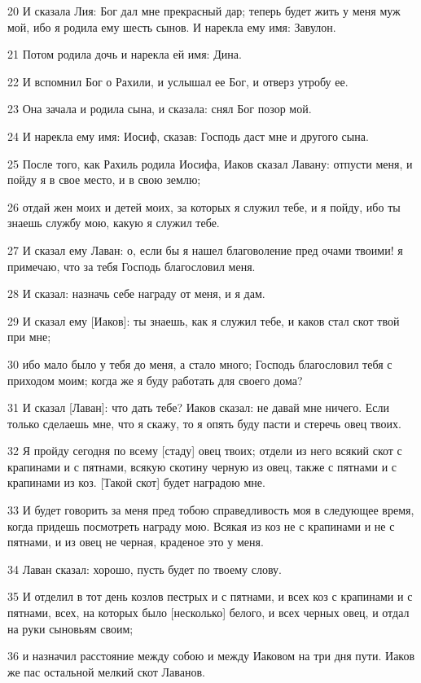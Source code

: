 \par 20 И сказала Лия: Бог дал мне прекрасный дар; теперь будет жить у меня муж мой, ибо я родила ему шесть сынов. И нарекла ему имя: Завулон.
\par 21 Потом родила дочь и нарекла ей имя: Дина.
\par 22 И вспомнил Бог о Рахили, и услышал ее Бог, и отверз утробу ее.
\par 23 Она зачала и родила сына, и сказала: снял Бог позор мой.
\par 24 И нарекла ему имя: Иосиф, сказав: Господь даст мне и другого сына.
\par 25 После того, как Рахиль родила Иосифа, Иаков сказал Лавану: отпусти меня, и пойду я в свое место, и в свою землю;
\par 26 отдай жен моих и детей моих, за которых я служил тебе, и я пойду, ибо ты знаешь службу мою, какую я служил тебе.
\par 27 И сказал ему Лаван: о, если бы я нашел благоволение пред очами твоими! я примечаю, что за тебя Господь благословил меня.
\par 28 И сказал: назначь себе награду от меня, и я дам.
\par 29 И сказал ему [Иаков]: ты знаешь, как я служил тебе, и каков стал скот твой при мне;
\par 30 ибо мало было у тебя до меня, а стало много; Господь благословил тебя с приходом моим; когда же я буду работать для своего дома?
\par 31 И сказал [Лаван]: что дать тебе? Иаков сказал: не давай мне ничего. Если только сделаешь мне, что я скажу, то я опять буду пасти и стеречь овец твоих.
\par 32 Я пройду сегодня по всему [стаду] овец твоих; отдели из него всякий скот с крапинами и с пятнами, всякую скотину черную из овец, также с пятнами и с крапинами из коз. [Такой скот] будет наградою мне.
\par 33 И будет говорить за меня пред тобою справедливость моя в следующее время, когда придешь посмотреть награду мою. Всякая из коз не с крапинами и не с пятнами, и из овец не черная, краденое это у меня.
\par 34 Лаван сказал: хорошо, пусть будет по твоему слову.
\par 35 И отделил в тот день козлов пестрых и с пятнами, и всех коз с крапинами и с пятнами, всех, на которых было [несколько] белого, и всех черных овец, и отдал на руки сыновьям своим;
\par 36 и назначил расстояние между собою и между Иаковом на три дня пути. Иаков же пас остальной мелкий скот Лаванов.
